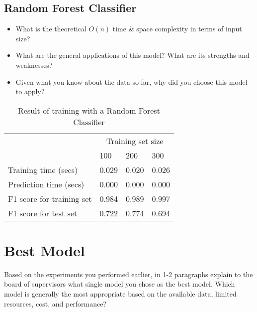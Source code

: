 \documentclass[12pt]{article}
\begin{document}

\subsection*{Random Forest Classifier}
\begin{itemize} [noitemsep,nolistsep]
\item What is the theoretical $O(n)$ time \& space complexity in terms of input size?
\item What are the general applications of this model? What are its strengths and weaknesses?
\item Given what you know about the data so far, why did you choose this model to apply?
\end{itemize} 


\setlength{\extrarowheight}{1.5pt}
\begin{table}[!htbp]
\caption{Result of training with a Random Forest Classifier} %
\centering %
\begin{tabular}{|p{6cm}|p{1.5cm}|p{1.5cm}|p{1.5cm}|} %
\hline %
& \multicolumn{3}{c|}{Training set size}\\[5pt]
\cline{2-4} 
& 100 & 200 & 300\\[0.5ex]
\hline %

Training time (secs)   &       0.029 & 0.020 & 0.026 \\
Prediction time (secs)   &     0.000 & 0.000 & 0.000 \\
F1 score for training set  &   0.984 & 0.989 & 0.997 \\
F1 score for test set    &     0.722 & 0.774 & 0.694 \\
\hline %
\end{tabular}
\label{randomForestClassifierTable}
\end{table}


\section*{Best Model}
Based on the experiments you performed earlier, in 1-2 paragraphs explain to the board of supervisors what single model you chose as the best model. Which model is generally the most appropriate based on the available data, limited resources, cost, and performance?
\end{document}
